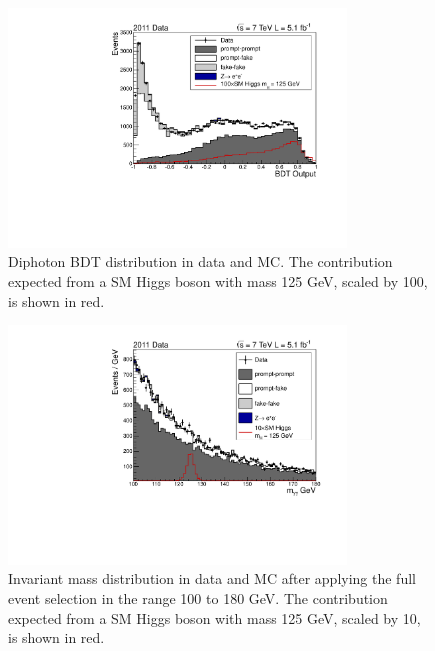 \begin{figure}[hbt!]
 \includegraphics[width=0.8\textwidth]{hgg7TeV/variablePlots/bdtoutput}
 \caption{Diphoton BDT distribution in data and MC. The contribution expected from a SM Higgs boson with mass 125 GeV, 
 scaled by 100, is shown in red. }
 \label{fig:diphotonBDT}
\end{figure}
\begin{figure}[hbt!]
  \includegraphics[width=0.8\textwidth]{hgg7TeV/variablePlots/mass}
 \caption{Invariant mass distribution in data and MC after applying the full event selection in the
 range 100 to 180 GeV. The contribution expected from a SM Higgs boson with mass 125 GeV, scaled by 10, 
 is shown in red. }
 \label{fig:massmcdata}
\end{figure}

